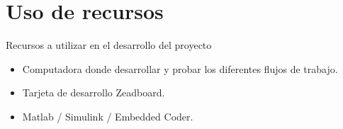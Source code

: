 \documentclass[10pt,aspectratio=169]{beamer} %
\begin{document}
\section{Uso de recursos}

\begin{frame}{Recursos a utilizar en el desarrollo del proyecto}
  \begin{itemize}
    \item Computadora donde desarrollar y probar los diferentes flujos de trabajo.
    \item Tarjeta de desarrollo Zeadboard.
    \item Matlab / Simulink / Embedded Coder.
  \end{itemize}
\end{frame}
\end{document}

